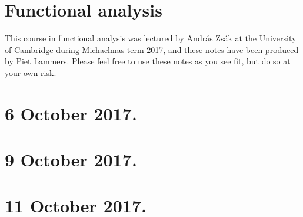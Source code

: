 \documentclass[11pt]{article}
\theoremstyle{definition}
\begin{document}
\section*{\LARGE Functional analysis}

\leftskip=1.5cm\rightskip=1.5cm

This course in functional analysis was lectured by Andr\'as Zs\'ak at the University of Cambridge during Michaelmas term 2017,
and these notes have been produced by Piet Lammers.
Please feel free to use these notes as you see fit, but do so at your own risk.

\leftskip=0cm \rightskip=0cm


\section{6 October 2017.}



\section{9 October 2017.}



\section{11 October 2017.}

\end{document}
